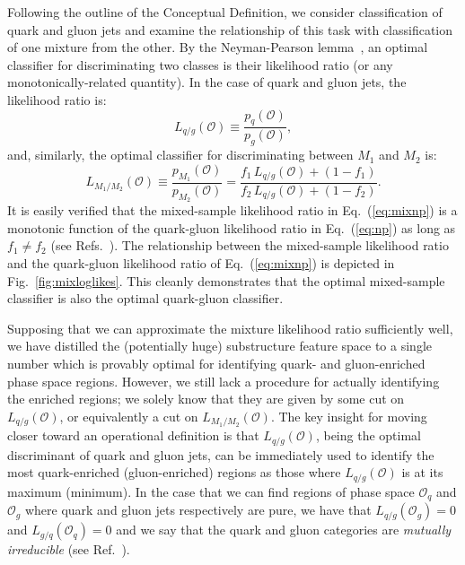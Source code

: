 \documentclass[letterpaper,11pt]{article}
\DeclareRobustCommand{\Fig}[1]{Fig.~\ref{#1}}
\DeclareRobustCommand{\Eq}[1]{Eq.~(\ref{#1})}
\DeclareRobustCommand{\Ref}[1]{Ref.~\cite{#1}}
\DeclareRobustCommand{\Refs}[1]{Refs.~\cite{#1}}
\renewcommand{\O}{\mathcal{O}}
\begin{document}
Following the outline of the Conceptual Definition, we consider classification of quark and gluon jets and examine the relationship of this task with classification of one mixture from the other.
%
By the Neyman-Pearson lemma~\cite{NPlemma}, an optimal classifier for discriminating two classes is their likelihood ratio (or any monotonically-related quantity).
%
In the case of quark and gluon jets, the likelihood ratio is:
\begin{equation}
\label{eq:np}
L_{q/g}(\O)\equiv\frac{p_q(\O)}{p_g(\O)},
\end{equation}
and, similarly, the optimal classifier for discriminating between $M_1$ and $M_2$ is:
\begin{equation}
\label{eq:mixnp}
L_{M_1/M_2}(\O)\equiv\frac{p_{M_1}(\O)}{p_{M_2}(\O)}=\frac{f_1 \, L_{q/g}(\O)+(1-f_1)}{f_2 \, L_{q/g}(\O)+(1-f_2)}.
\end{equation}
It is easily verified that the mixed-sample likelihood ratio in \Eq{eq:mixnp} is a monotonic function of the quark-gluon likelihood ratio in \Eq{eq:np} as long as $f_1\neq f_2$ (see \Refs{blanchard2016classification,Metodiev:2017vrx}).
%
The relationship between the mixed-sample likelihood ratio and the quark-gluon likelihood ratio of \Eq{eq:mixnp} is depicted in \Fig{fig:mixloglikes}.
%
This cleanly demonstrates that the optimal mixed-sample classifier is also the optimal quark-gluon classifier.


Supposing that we can approximate the mixture likelihood ratio sufficiently well, we have distilled the (potentially huge) substructure feature space to a single number which is provably optimal for identifying quark- and gluon-enriched phase space regions.
%
However, we still lack a procedure for actually identifying the enriched regions; we solely know that they are given by some cut on $L_{q/g}(\O)$, or equivalently a cut on $L_{M_1/M_2}(\O)$.
%
The key insight for moving closer toward an operational definition is that $L_{q/g}(\O)$, being the optimal discriminant of quark and gluon jets, can be immediately used to identify the most quark-enriched (gluon-enriched) regions as those where $L_{q/g}(\O)$ is at its maximum (minimum). 
%
In the case that we can find regions of phase space $\mathcal O_q$ and $\mathcal O_g$ where quark and gluon jets respectively are pure, we have that $L_{q/g}(\O_g)=0$ and $L_{g/q}(\O_q)=0$ and we say that the quark and gluon categories are \emph{mutually irreducible} (see \Ref{blanchard2016classification,Metodiev:2018ftz}).
\end{document}

